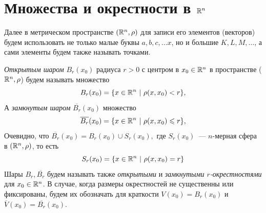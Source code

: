 \documentclass[../../main.tex]{subfiles}
\begin{document}
  
  \section{Множества и окрестности в $\mathbb{R}^n$}
  Далее в метрическом пространстве $(\mathbb{R}^n, \rho)$ для записи его 
  элементов (векторов) будем использовать не только малые буквы
  $a, b, c, \dots x$, но и большие $K, L, M, \dots$, а сами 
  элементы будем также называть точками.
  
  \emph{Открытым шаром} $B_r(x_0)$ радиуса $r > 0$ с центром в $x_0 \in 
  \mathbb{R}^n$ в пространстве ($\mathbb{R}^n, \rho$) будем называть множество 
  \[
  B_r(x_0) = \{x \in \mathbb{R}^n\ |\ \rho(x, x_0) < r\}, 
  \]
  А \emph{замкнутым шаром} $\overline{B_r}(x_0)$ множество
  \[
  \overline{B_r}(x_0) = \{x \in \mathbb{R}^n\ |\ \rho(x, x_0) \leqslant r\}, 
  \] 
  Очевидно, что $\overline{B_r}(x_0) = B_r(x_0) \cup S_r(x_0),$ где $ 
  S_r(x_0)$~--- $n$-мерная сфера в  $(\mathbb{R}^n, \rho)$, то есть 
  \[
  S_r(x_0) = \{x \in \mathbb{R}^n\ |\ \rho(x, x_0) = r\}
  \] 
  Шары $B_r, \overline{B_r}$ будем называть также \emph{открытыми} и 
  \emph{замкнутыми $r$-окрестностями} для $x_0 \in \mathbb{R}^n$. В случае, 
  когда размеры окрестностей не существенны или фиксированы, 
  будем их обозначать для краткости $V(x_0) = B_r(x_0)$ и 
  $\overline{V}(x_0) = \overline{B_r}(x_0)$.
  
\end{document}
